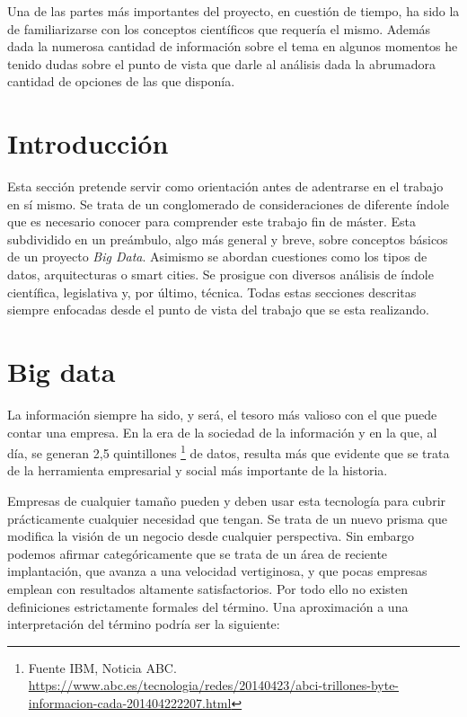 
Una de las partes más importantes del proyecto, en cuestión de tiempo, ha sido la de familiarizarse con los conceptos científicos que requería el mismo. Además dada la numerosa cantidad de información sobre el tema en algunos momentos he tenido dudas sobre el punto de vista que darle al análisis dada la abrumadora cantidad de opciones de las que disponía. 

\section{Introducción}\label{teorico-introduccion}
Esta sección pretende servir como orientación antes de adentrarse en el trabajo en sí mismo. Se trata de un conglomerado de consideraciones de diferente índole que es necesario conocer para comprender este trabajo fin de máster. Esta subdividido en un preámbulo, algo más general y breve, sobre conceptos básicos de un proyecto \emph{Big Data}. Asimismo se abordan cuestiones como los tipos de datos, arquitecturas o smart cities. Se prosigue con diversos análisis de índole científica, legislativa y, por último, técnica. Todas estas secciones descritas siempre enfocadas desde el punto de vista del trabajo que se esta realizando.

\section{Big data}\label{teorico-big-data}
La información siempre ha sido, y será, el tesoro más valioso con el que puede contar una empresa. En la era de la sociedad de la información y en la que, al día, se generan 2,5 quintillones \footnote{Fuente IBM, Noticia ABC. \url{https://www.abc.es/tecnologia/redes/20140423/abci-trillones-byte-informacion-cada-201404222207.html}} de datos, resulta más que evidente que se trata de la herramienta empresarial y social más importante de la historia. 

Empresas de cualquier tamaño pueden y deben usar esta tecnología para cubrir prácticamente cualquier necesidad que tengan. Se trata de un nuevo prisma que modifica la visión de un negocio desde cualquier perspectiva. Sin embargo podemos afirmar categóricamente que se trata de un área de reciente implantación, que avanza a una velocidad vertiginosa, y que pocas empresas emplean con resultados altamente satisfactorios. Por todo ello no existen definiciones estrictamente formales del término. Una aproximación a una interpretación del término podría ser la siguiente:

